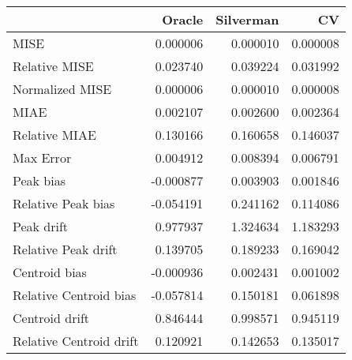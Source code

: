 \begin{tabular}{lrrr}
  \hline
 & Oracle & Silverman & CV \\ 
  \hline
MISE & 0.000006 & 0.000010 & 0.000008 \\ 
  Relative MISE & 0.023740 & 0.039224 & 0.031992 \\ 
  Normalized MISE & 0.000006 & 0.000010 & 0.000008 \\ 
  MIAE & 0.002107 & 0.002600 & 0.002364 \\ 
  Relative MIAE & 0.130166 & 0.160658 & 0.146037 \\ 
  Max Error & 0.004912 & 0.008394 & 0.006791 \\ 
  Peak bias & -0.000877 & 0.003903 & 0.001846 \\ 
  Relative Peak bias & -0.054191 & 0.241162 & 0.114086 \\ 
  Peak drift & 0.977937 & 1.324634 & 1.183293 \\ 
  Relative Peak drift & 0.139705 & 0.189233 & 0.169042 \\ 
  Centroid bias & -0.000936 & 0.002431 & 0.001002 \\ 
  Relative Centroid bias & -0.057814 & 0.150181 & 0.061898 \\ 
  Centroid drift & 0.846444 & 0.998571 & 0.945119 \\ 
  Relative Centroid drift & 0.120921 & 0.142653 & 0.135017 \\ 
   \hline
\end{tabular}
